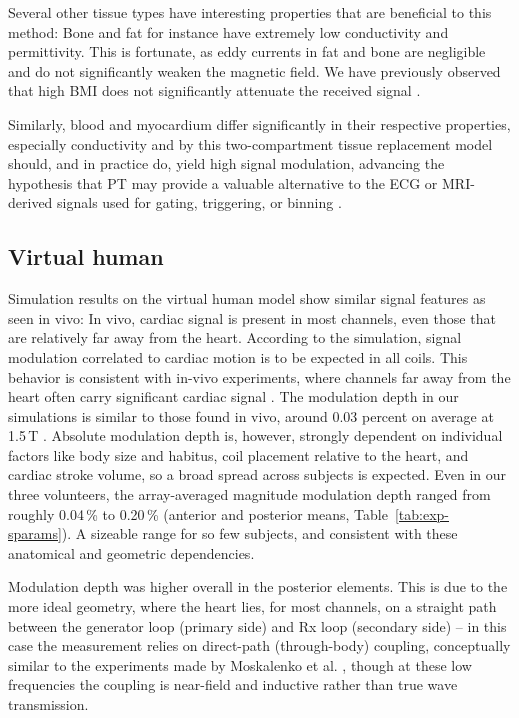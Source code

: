 \documentclass[
]{article}
\begin{document}
Several other tissue types have interesting properties that are
beneficial to this method: Bone and fat for instance have extremely low
conductivity and permittivity. This is fortunate, as eddy currents in
fat and bone are negligible and do not significantly weaken the magnetic
field. We have previously observed that high BMI does not significantly
attenuate the received signal \cite{Bacher2017CardiacStudy}.

Similarly, blood and myocardium differ significantly in their respective
properties, especially conductivity and by this two-compartment tissue
replacement model should, and in practice do, yield high signal
modulation, advancing the hypothesis that PT may provide a valuable
alternative to the ECG or MRI-derived signals used for gating,
triggering, or binning \cite{Qian2025ComparisonStudy, Mizuno2024ClinicalLeads}.

\subsection{\texorpdfstring{Virtual human
}{Virtual human }}\label{virtual-human}

Simulation results on the virtual human model show similar signal
features as seen in vivo: In vivo, cardiac signal is present in most
channels, even those that are relatively far away from the heart.
According to the simulation, signal modulation correlated to cardiac
motion is to be expected in all coils. This behavior is consistent with
in-vivo experiments, where channels far away from the heart often carry
significant cardiac signal \cite{Bacher2017PilotInitialization, Bacher2017CardiacStudy}. The modulation depth in our
simulations is similar to those found in vivo, around 0.03 percent on
average at 1.5\,T \cite{Bacher2017CardiacStudy}. Absolute modulation depth is, however, strongly dependent on individual factors like body size and habitus, coil placement relative to the heart, and cardiac stroke volume, so a broad spread across subjects is expected. Even in our three volunteers, the array-averaged magnitude modulation depth ranged from roughly 0.04\,\% to 0.20\,\% (anterior and posterior means, Table~\ref{tab:exp-sparams}). A sizeable range for so few subjects, and consistent with these anatomical and geometric dependencies.

Modulation depth was higher overall in the posterior elements. This is
due to the more ideal geometry, where the heart lies, for most channels,
on a straight path between the generator loop (primary side) and Rx loop
(secondary side) -- in this case the measurement relies on direct-path (through-body) coupling, conceptually similar to the experiments made by Moskalenko et al. \cite{Moskalenko1958, Moskalenko1960, Moskalenko1963OnElectroplethysmography}, though at these low frequencies the coupling is near-field and inductive rather than true wave transmission.
\end{document}

